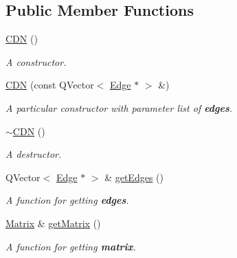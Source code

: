 \subsection*{Public Member Functions}
\begin{DoxyCompactItemize}
\item 
\mbox{\label{class_c_d_n_ab3c19205034b36aebf6ef4bccab75775}} 
\mbox{\hyperlink{class_c_d_n_ab3c19205034b36aebf6ef4bccab75775}{C\+DN}} ()
\begin{DoxyCompactList}\small\item\em A {\itshape constructor}. \end{DoxyCompactList}\item 
\mbox{\label{class_c_d_n_a4b29e4151276e9541507819204416e83}} 
\mbox{\hyperlink{class_c_d_n_a4b29e4151276e9541507819204416e83}{C\+DN}} (const Q\+Vector$<$ \mbox{\hyperlink{class_edge}{Edge}} $\ast$ $>$ \&)
\begin{DoxyCompactList}\small\item\em A {\itshape particular} constructor with parameter list of {\bfseries{edges}}. \end{DoxyCompactList}\item 
\mbox{\label{class_c_d_n_a83928229daa9f0d789bae210d735b999}} 
\mbox{\hyperlink{class_c_d_n_a83928229daa9f0d789bae210d735b999}{$\sim$\+C\+DN}} ()
\begin{DoxyCompactList}\small\item\em A {\itshape destructor}. \end{DoxyCompactList}\item 
\mbox{\label{class_c_d_n_ac484a99bc0037bdacf455c01830362b1}} 
Q\+Vector$<$ \mbox{\hyperlink{class_edge}{Edge}} $\ast$ $>$ \& \mbox{\hyperlink{class_c_d_n_ac484a99bc0037bdacf455c01830362b1}{get\+Edges}} ()
\begin{DoxyCompactList}\small\item\em A {\itshape function} for getting {\bfseries{edges}}. \end{DoxyCompactList}\item 
\mbox{\label{class_c_d_n_a6ba0f33eca61a4e9be50780244a5cc6e}} 
\mbox{\hyperlink{class_matrix}{Matrix}} \& \mbox{\hyperlink{class_c_d_n_a6ba0f33eca61a4e9be50780244a5cc6e}{get\+Matrix}} ()
\begin{DoxyCompactList}\small\item\em A {\itshape function} for getting {\bfseries{matrix}}. \end{DoxyCompactList}\item 

\end{DoxyCompactItemize}
